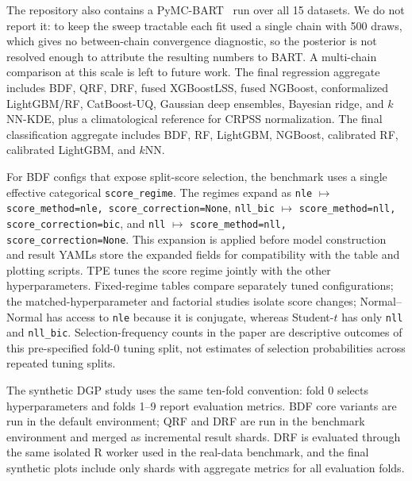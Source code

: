 The repository also contains a PyMC-BART~\citep{chipman2010bart} run over all 15 datasets. We do not report it: to keep the sweep tractable each fit used a single chain with 500 draws, which gives no between-chain convergence diagnostic, so the posterior is not resolved enough to attribute the resulting numbers to BART. A multi-chain comparison at this scale is left to future work. The final regression aggregate includes BDF, QRF, DRF, fused XGBoostLSS, fused NGBoost, conformalized LightGBM/RF, CatBoost-UQ, Gaussian deep ensembles, Bayesian ridge, and $k$NN-KDE, plus a climatological reference for CRPSS normalization. The final classification aggregate includes BDF, RF, LightGBM, NGBoost, calibrated RF, calibrated LightGBM, and $k$NN.

For BDF configs that expose split-score selection, the benchmark uses a single effective categorical \texttt{score\_regime}. The regimes expand as \texttt{nle} $\mapsto$ \texttt{score\_method=nle, score\_correction=None}, \texttt{nll\_bic} $\mapsto$ \texttt{score\_method=nll, score\_correction=bic}, and \texttt{nll} $\mapsto$ \texttt{score\_method=nll, score\_correction=None}. This expansion is applied before model construction and result YAMLs store the expanded fields for compatibility with the table and plotting scripts. TPE tunes the score regime jointly with the other hyperparameters. Fixed-regime tables compare separately tuned configurations; the matched-hyperparameter and factorial studies isolate score changes; Normal--Normal has access to \texttt{nle} because it is conjugate, whereas Student-$t$ has only \texttt{nll} and \texttt{nll\_bic}. Selection-frequency counts in the paper are descriptive outcomes of this pre-specified fold-0 tuning split, not estimates of selection probabilities across repeated tuning splits.

The synthetic DGP study uses the same ten-fold convention: fold 0 selects hyperparameters and folds 1--9 report evaluation metrics. BDF core variants are run in the default environment; QRF and DRF are run in the benchmark environment and merged as incremental result shards. DRF is evaluated through the same isolated R worker used in the real-data benchmark, and the final synthetic plots include only shards with aggregate metrics for all evaluation folds.

